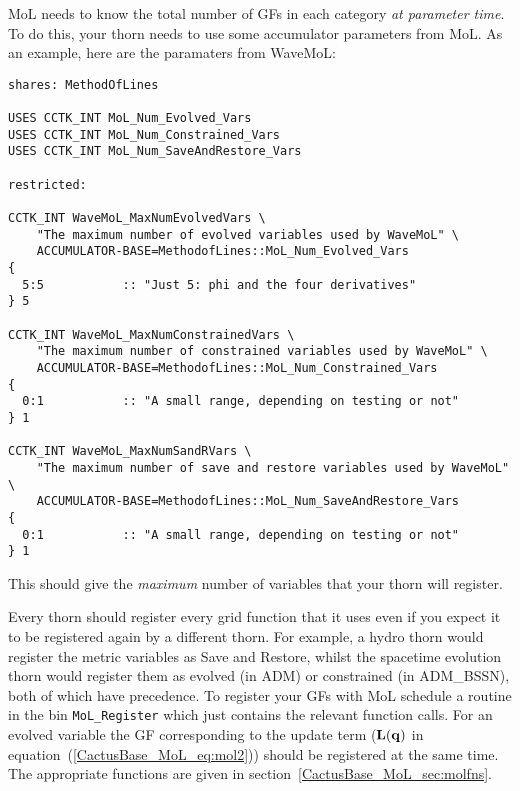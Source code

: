 MoL needs to know the total number of GFs in each category \textit{at
  parameter time}. To do this, your thorn needs to use some
accumulator parameters from MoL. As an example, here are the
paramaters from WaveMoL:
\begin{verbatim}
shares: MethodOfLines

USES CCTK_INT MoL_Num_Evolved_Vars
USES CCTK_INT MoL_Num_Constrained_Vars
USES CCTK_INT MoL_Num_SaveAndRestore_Vars

restricted:

CCTK_INT WaveMoL_MaxNumEvolvedVars \
    "The maximum number of evolved variables used by WaveMoL" \
    ACCUMULATOR-BASE=MethodofLines::MoL_Num_Evolved_Vars
{
  5:5           :: "Just 5: phi and the four derivatives"
} 5

CCTK_INT WaveMoL_MaxNumConstrainedVars \
    "The maximum number of constrained variables used by WaveMoL" \
    ACCUMULATOR-BASE=MethodofLines::MoL_Num_Constrained_Vars
{
  0:1           :: "A small range, depending on testing or not"
} 1

CCTK_INT WaveMoL_MaxNumSandRVars \
    "The maximum number of save and restore variables used by WaveMoL" \
    ACCUMULATOR-BASE=MethodofLines::MoL_Num_SaveAndRestore_Vars
{
  0:1           :: "A small range, depending on testing or not"
} 1
\end{verbatim}
This should give the \textit{maximum} number of variables that your
thorn will register.

Every thorn should register every grid function that it uses even if
you expect it to be registered again by a different thorn. For
example, a hydro thorn would register the metric variables as Save and
Restore, whilst the spacetime evolution thorn would register them as
evolved (in ADM) or constrained (in ADM\_BSSN), both of which have
precedence. To register your GFs with MoL schedule a routine in the
bin {\tt MoL\_Register} which just contains the relevant function
calls.  For an evolved variable the GF corresponding to the update
term (${\bf L}({\bf q})$ in equation~(\ref{CactusBase_MoL_eq:mol2}))
should be registered at the same time. The appropriate functions are
given in section~\ref{CactusBase_MoL_sec:molfns}.

